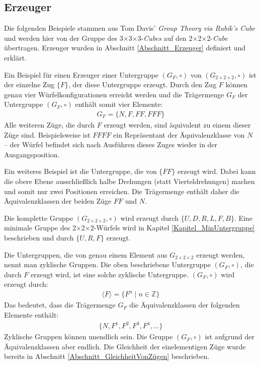 \documentclass[12pt,a4paper, usenames, dvipsnames]{article}
\theoremstyle{mystyle}
\theoremstyle{definition}
\newcommand{\Gtwo}{\ensuremath{G_{2\times 2\times 2}}}
\newcommand{\Ttwo}{2$\times$2$\times$2-}
\newcommand{\Tthree}{3$\times$3$\times$3-}
\begin{document}
%
%
%
%
%
%
%
%
%
%
%
%
%
%
%
%
%
%
%
%

\subsection{Erzeuger}
\label{Abschnitt_ErzeugerGF}

Die folgenden Beispiele stammen aus Tom Davis' \textit{Group Theory via Rubik's Cube} \cite{TD} und werden hier von der Gruppe des \Tthree \textit{Cubes} auf den \Ttwo \textit{Cube} übertragen. Erzeuger wurden in Abschnitt \ref{Abschnitt_Erzeuger} definiert und erklärt.


Ein Beispiel für einen Erzeuger einer Untergruppe $(G_F, \circ)$ von $(\Gtwo, \circ)$ ist der einzelne Zug $\{ F \}$, der diese Untergruppe erzeugt. Durch den Zug $F$ können genau vier Würfelkonfigurationen erreicht werden und die Trägermenge $G_F$ der Untergruppe $(G_F, \circ)$ enthält somit vier Elemente:
\begin{align*}
G_F = \{N, F, FF, FFF\}
\end{align*}
Alle weiteren Züge, die durch $F$ erzeugt werden, sind äquivalent zu einem dieser Züge sind. Beispielsweise ist $FFFF$ ein Repräsentant der Äquivalenzklasse von $N$ -- der Würfel befindet sich nach Ausführen dieses Zuges wieder in der Ausgangsposition.


Ein weiteres Beispiel ist die Untergruppe, die von $\{FF\}$ erzeugt wird. Dabei kann die obere Ebene ausschließlich halbe Drehungen (statt Vierteldrehungen) machen und somit nur zwei Positionen erreichen. Die Trägermenge enthält daher die Äquivalenzklassen der beiden Züge $FF$ und $N$.


Die komplette Gruppe $(\Gtwo, \circ)$ wird erzeugt durch $\{U, D, R, L, F, B\}$. Eine minimale Gruppe des \Ttwo Würfels wird in Kapitel \ref{Kapitel_MinUntergruppe} beschrieben und durch $\{U, R, F\}$ erzeugt.

Die Untergruppen, die von genau einem Element aus $\Gtwo$ erzeugt werden, nennt man zyklische Gruppen. Die oben beschriebene Untergruppe $(G_F, \circ)$, die durch $ F $ erzeugt wird, ist eine solche zyklische Untergruppe.
$(G_F, \circ)$ wird erzeugt durch:
\begin{align*}
\langle F \rangle = \{ F^n \mid n \in \mathbb{Z}\}
\end{align*}
Das bedeutet, dass die Trägermenge $G_F$ die Äquivalenzklassen der folgenden Elemente enthält: 
\begin{align*}
\{N, F^1, F^2, F^3, F^4, ...\}
\end{align*}
Zyklische Gruppen können unendlich sein. Die Gruppe $(G_F,  \circ)$ ist aufgrund der Äquivalenzklassen aber endlich. Die Gleichheit der einelementigen Züge wurde bereits in Abschnitt \ref{Abschnitt_GleichheitVonZügen} beschrieben.
\end{document}
